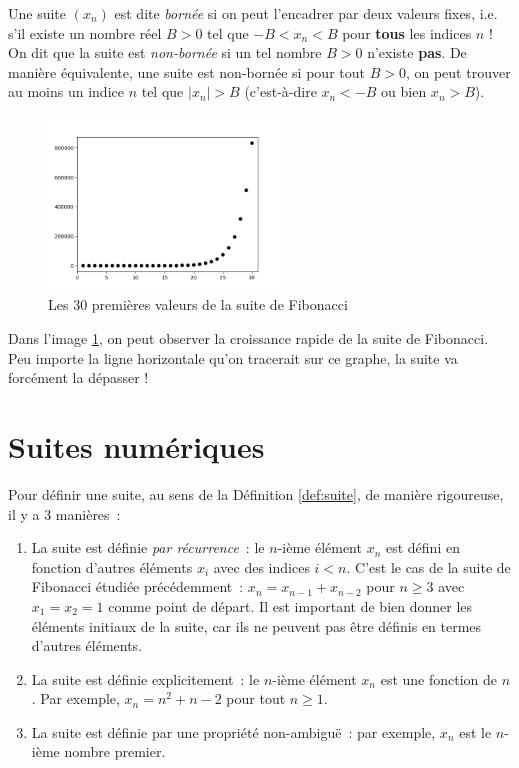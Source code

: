 \begin{boxdef}
Une suite $(x_n)$ est dite \emph{bornée} si on peut l'encadrer par deux valeurs fixes, i.e. s'il existe un nombre réel $B > 0$ tel que $-B < x_n < B$ pour \textbf{tous} les indices $n$ ! On dit que la suite est \emph{non-bornée} si un tel nombre $B > 0$ n'existe \textbf{pas}. De manière équivalente, une suite est non-bornée si pour tout $B > 0$, on peut trouver au moins un indice $n$ tel que $|x_n| > B$ (c'est-à-dire $x_n < - B$ ou bien $x_n > B$).
\label{def:borné}
\end{boxdef}

\begin{figure}[H]
\centering \includegraphics[width = 0.55\textwidth]{./assets/imgs/fibonacci.png}
\caption{Les 30 premières valeurs de la suite de Fibonacci}
\label{fig:fibonacci}
\end{figure}

Dans l'image \ref{fig:fibonacci}, on peut observer la croissance rapide de la suite de Fibonacci. Peu importe la ligne horizontale qu'on tracerait sur ce graphe, la suite va forcément la dépasser !

\section{Suites numériques}

Pour définir une suite, au sens de la Définition \ref{def:suite}, de manière rigoureuse, il y a 3 manières~:

\begin{enumerate}
    \item La suite est définie \emph{par récurrence}~: le $n$-ième élément $x_n$ est défini en fonction d'autres éléments $x_i$ avec des indices $i < n$. C'est le cas de la suite de Fibonacci étudiée précédemment~: $x_n = x_{n-1} + x_{n-2}$ pour $n \geq 3$ avec $x_1 = x_2 = 1$ comme point de départ. Il est important de bien donner les éléments initiaux de la suite, car ils ne peuvent pas être définis en termes d'autres éléments.
    \item La suite est définie explicitement~: le $n$-ième élément $x_n$ est une fonction de $n$. Par exemple, $x_n = n^2 + n - 2$ pour tout $n \geq 1$.
    \item La suite est définie par une propriété non-ambiguë~: par exemple, $x_n$ est le $n$-ième nombre premier.
\end{enumerate}

